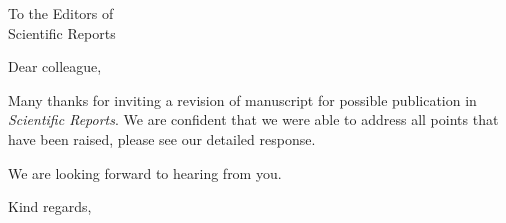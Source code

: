 \documentclass[USenglish, 10pt, UBonn_letterhead]{scrlttr2}
\begin{document}


\begin{letter}{%
        To the Editors of\\
        Scientific Reports \\
    }

    \opening{Dear colleague,}

    Many thanks for inviting a revision of manuscript for possible publication in
    \textit{Scientific Reports}. We are confident that we were able  to address all
    points that have been raised, please see our detailed response.

    We are looking forward to hearing from you.

    \closing{Kind regards,}

\end{letter}
\end{document}
